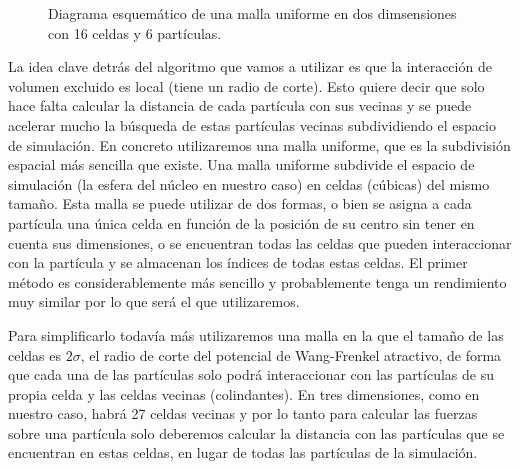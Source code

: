 \begin{figure}
    \centering
    \caption{Diagrama esquemático de una malla uniforme en dos dimsensiones  con 16 celdas y 6 partículas.}
    \label{fig:grid-diagram}
\end{figure}

La idea clave detrás del algoritmo que vamos a utilizar es que la interacción de volumen excluido es local (tiene un radio de corte). Esto quiere decir que solo hace falta calcular la distancia de cada partícula con sus vecinas y se puede acelerar mucho la búsqueda de estas partículas vecinas subdividiendo el espacio de simulación. En concreto utilizaremos una malla uniforme, que es la subdivisión espacial más sencilla que existe. Una malla uniforme subdivide el espacio de simulación (la esfera del núcleo en nuestro caso) en celdas (cúbicas) del mismo tamaño. Esta malla se puede utilizar de dos formas, o bien se asigna a cada partícula una única celda en función de la posición de su centro sin tener en cuenta sus dimensiones, o se encuentran todas las celdas que pueden interaccionar con la partícula y se almacenan los índices de todas estas celdas. El primer método es considerablemente más sencillo y probablemente tenga un rendimiento muy similar por lo que será el que utilizaremos.

Para simplificarlo todavía más utilizaremos una malla en la que el tamaño de las celdas es $2\sigma$, el radio de corte del potencial de Wang-Frenkel atractivo, de forma que cada una de las partículas solo podrá interaccionar con las partículas de su propia celda y las celdas vecinas (colindantes). En tres dimensiones, como en nuestro caso, habrá 27 celdas vecinas y por lo tanto para calcular las fuerzas sobre una partícula solo deberemos calcular la distancia con las partículas que se encuentran en estas celdas, en lugar de todas las partículas de la simulación.


